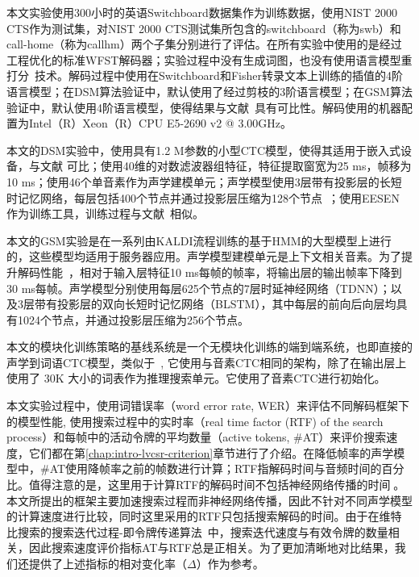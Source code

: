 本文实验使用300小时的英语Switchboard数据集作为训练数据\cite{godfrey1992switchboard}，使用NIST 2000 CTS作为测试集，对NIST 2000 CTS测试集所包含的switchboard（称为swb）和call-home（称为callhm）两个子集分别进行了评估。在所有实验中使用的是经过工程优化的标准WFST解码器；实验过程中没有生成词图，也没有使用语言模型重打分~\cite{povey2012generating}技术。解码过程中使用在Switchboard和Fisher转录文本上训练的插值的4阶语言模型；在DSM算法验证中，默认使用了经过剪枝的3阶语言模型；在GSM算法验证中，默认使用4阶语言模型，使得结果与文献~\cite{povey2016purely}具有可比性。解码使用的机器配置为Intel（R）Xeon（R）CPU E5-2690 v2 @ 3.00GHz。

本文的DSM实验中，使用具有1.2 M参数的小型CTC模型，使得其适用于嵌入式设备，与文献 \cite{mcgraw2016personalized}可比；使用40维的对数滤波器组特征，特征提取窗宽为25 ms，帧移为10 ms；使用46个单音素作为声学建模单元；声学模型使用3层带有投影层的长短时记忆网络，每层包括400个节点并通过投影层压缩为128个节点~\cite{sak2014long}；使用EESEN \cite{miao2016ctc}作为训练工具，训练过程与文献~\cite{miao2015eesen}相似。

本文的GSM实验是在一系列由KALDI流程\cite{povey2011kaldi}训练的基于HMM的大型模型上进行的，这些模型均适用于服务器应用。声学模型建模单元是上下文相关音素。为了提升解码性能~\cite{pundak2016lower,povey2016purely}，相对于输入层特征10 ms每帧的帧率，将输出层的输出帧率下降到30 ms每帧。声学模型分别使用每层625个节点的7层时延神经网络（TDNN）；以及3层带有投影层的双向长短时记忆网络（BLSTM），其中每层的前向后向层均具有1024个节点，并通过投影层压缩为256个节点。

本文的模块化训练策略的基线系统是一个无模块化训练的端到端系统，也即直接的声学到词语CTC模型，类似于~\cite{audhkhasi2017direct}, 它使用与音素CTC相同的架构，除了在输出层上使用了 30K 大小的词表作为推理搜索单元。它使用了音素CTC进行初始化。

本文实验过程中，使用词错误率（word error rate, WER）来评估不同解码框架下的模型性能, 使用搜索过程中的实时率（real time factor (RTF) of the search process）和每帧中的活动令牌的平均数量（active tokens, \#AT）来评价搜索速度，它们都在第\ref{chap:intro-lvcsr-criterion}章节进行了介绍。在降低帧率的声学模型中，\#AT使用降帧率之前的帧数进行计算；RTF指解码时间与音频时间的百分比。值得注意的是，这里用于计算RTF的解码时间不包括神经网络传播的时间\cite{you2009parallel,hauswald2015sirius}。本文所提出的框架主要加速搜索过程而非神经网络传播，因此不针对不同声学模型的计算速度进行比较，同时这里采用的RTF只包括搜索解码的时间。由于在维特比搜索的搜索迭代过程-即令牌传递算法~\cite{hori2013speech}中，搜索迭代速度与有效令牌的数量相关，因此搜索速度评价指标AT与RTF总是正相关。为了更加清晰地对比结果，我们还提供了上述指标的相对变化率（$\Delta$）作为参考。

